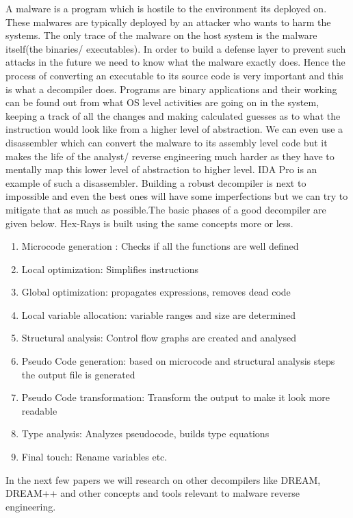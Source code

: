 \documentclass[11pt]{article}
\begin{document}
	A malware is a program which is hostile to the environment its deployed on. These malwares are typically deployed by an attacker who wants to harm the systems. The only trace of the malware on the host system is the malware itself(the binaries/ executables). In order to build a defense layer to prevent such attacks in the future we need to know what the malware exactly does. Hence the process of converting an executable to its source code is very important and this is what a decompiler does. Programs are binary applications and their working can be found out from what OS level activities are going on in the system, keeping a track of all the changes and making calculated guesses as to what the instruction would look like from a higher level of abstraction. We can even use a disassembler which can convert the malware to its assembly level code but it makes the life of the analyst/ reverse engineering much harder as they have to mentally map this lower level of abstraction to higher level. IDA Pro is an example of such a disassembler. Building a robust decompiler is next to impossible and even the best ones will have some imperfections but we can try to mitigate that as much as possible.The basic phases of a good decompiler are given below. Hex-Rays is built using the same concepts more or less.
	\begin{enumerate}
		\item Microcode generation : Checks if all the functions are well defined
		\item Local optimization: Simplifies instructions
		\item Global optimization: propagates expressions, removes dead code
		\item Local variable allocation: variable ranges and size are determined
		\item Structural analysis: Control flow graphs are created and analysed
		\item Pseudo Code generation: based on microcode and structural analysis steps the output file is generated
		\item Pseudo Code transformation: Transform the output to make it look more readable
		\item Type analysis: Analyzes pseudocode, builds type equations
		\item Final touch: Rename variables etc.
	\end{enumerate}
	In the next few papers we will research on other decompilers like DREAM, DREAM++ and other concepts and tools relevant to malware reverse engineering.
	
\end{document}
